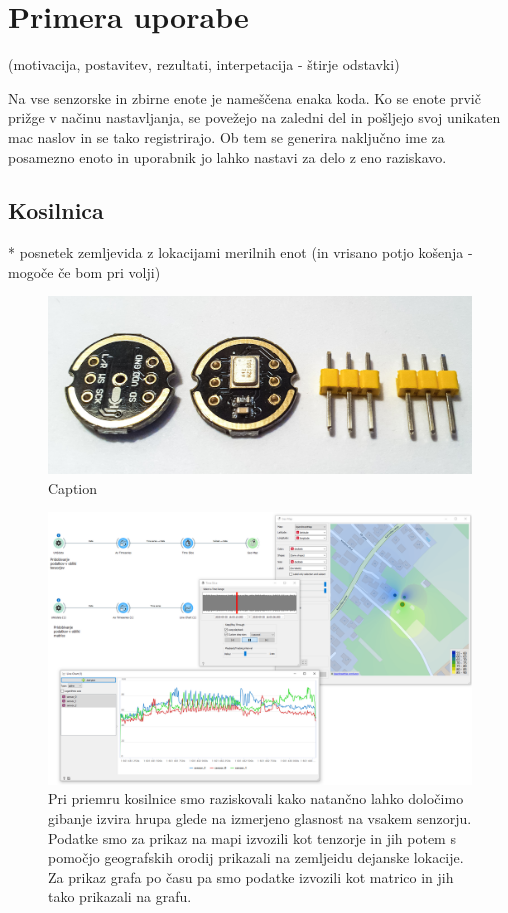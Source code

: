 \documentclass[a4paper, 12pt]{book}
\begin{document}
\chapter{Primera uporabe}
(motivacija, postavitev, rezultati, interpetacija - štirje odstavki)

Na vse senzorske in zbirne enote je nameščena enaka koda. Ko se enote prvič prižge v načinu nastavljanja, se povežejo na zaledni del in pošljejo svoj unikaten mac naslov in se tako registrirajo. Ob tem se generira naključno ime za posamezno enoto in uporabnik jo lahko nastavi za delo z eno raziskavo. 

\section{Kosilnica}

* posnetek zemljevida z lokacijami merilnih enot (in vrisano potjo košenja - mogoče če bom pri volji)
\begin{figure}[H]
    \centering
    \includegraphics[width=\linewidth]{slikovno_gradivo/INMP441_1.jpg}
    \caption{Caption}
    \label{fig:INMP441}
\end{figure}


\begin{figure}[H]
    \centering
    \includegraphics[width=\linewidth]{slikovno_gradivo/kosilnica-workflow.png}
    \caption{Pri priemru kosilnice smo raziskovali kako natančno lahko določimo gibanje izvira hrupa glede na  izmerjeno glasnost na vsakem senzorju. Podatke smo za prikaz na mapi izvozili kot tenzorje in jih potem s pomočjo geografskih orodij prikazali na zemljeidu dejanske lokacije. Za prikaz grafa po času pa smo podatke izvozili kot matrico in jih tako prikazali na grafu.}
    \label{fig:workflow_kosilnica}
\end{figure}
\end{document}
